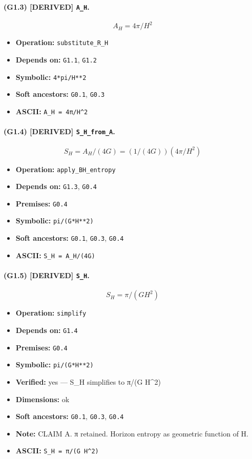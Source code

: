 \documentclass[11pt,a4paper]{article}
\theoremstyle{remark}\newtheorem*{caution}{Caution}
\newcommand{\tagbox}[1]{\textsc{[#1]}}
\begin{document}
\paragraph{(G1.3) \tagbox{DERIVED} \texttt{A\_H}.}
\begin{equation}
A_H=4\pi/H^2
\tag{G1.3}
\end{equation}
\begin{itemize}\setlength{\itemsep}{0.12em}
\item \textbf{Operation:} \texttt{substitute\_R\_H}
\item \textbf{Depends on:} \texttt{G1.1}, \texttt{G1.2}
\item \textbf{Symbolic:} \texttt{4*pi/H**2}
\item \textbf{Soft ancestors:} \texttt{G0.1}, \texttt{G0.3}
\item \textbf{ASCII:} \texttt{A\_H = 4π/H^2}
\end{itemize}
\paragraph{(G1.4) \tagbox{DERIVED} \texttt{S\_H\_from\_A}.}
\begin{equation}
S_H=A_H/(4G)=(1/(4G))(4\pi/H^2)
\tag{G1.4}
\end{equation}
\begin{itemize}\setlength{\itemsep}{0.12em}
\item \textbf{Operation:} \texttt{apply\_BH\_entropy}
\item \textbf{Depends on:} \texttt{G1.3}, \texttt{G0.4}
\item \textbf{Premises:} \texttt{G0.4}
\item \textbf{Symbolic:} \texttt{pi/(G*H**2)}
\item \textbf{Soft ancestors:} \texttt{G0.1}, \texttt{G0.3}, \texttt{G0.4}
\item \textbf{ASCII:} \texttt{S\_H = A\_H/(4G)}
\end{itemize}
\paragraph{(G1.5) \tagbox{DERIVED} \texttt{S\_H}.}
\begin{equation}
S_H=\pi/(G H^2)
\tag{G1.5}
\end{equation}
\begin{itemize}\setlength{\itemsep}{0.12em}
\item \textbf{Operation:} \texttt{simplify}
\item \textbf{Depends on:} \texttt{G1.4}
\item \textbf{Premises:} \texttt{G0.4}
\item \textbf{Symbolic:} \texttt{pi/(G*H**2)}
\item \textbf{Verified:} yes --- S\_H simplifies to π/(G H^2)
\item \textbf{Dimensions:} ok
\item \textbf{Soft ancestors:} \texttt{G0.1}, \texttt{G0.3}, \texttt{G0.4}
\item \textbf{Note:} CLAIM A. π retained. Horizon entropy as geometric function of H.
\item \textbf{ASCII:} \texttt{S\_H = π/(G H^2)}
\end{itemize}
\end{document}
